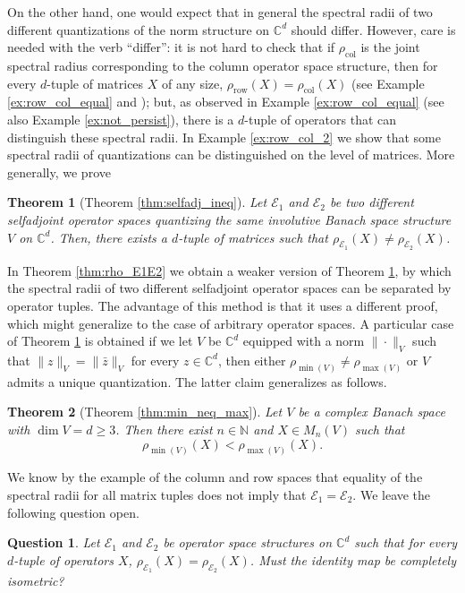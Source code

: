 \documentclass[12pt]{amsart}
\numberwithin{equation}{section}
\newtheorem{quest}[theorem]{Question}
\newtheorem{thmA}{Theorem}
\theoremstyle{definition}
\newcommand{\cE}{\mathcal{E}}
\newcommand{\C}{\mathbb{C}}
\begin{document}
On the other hand, one would expect that in general the spectral radii of two different quantizations of the norm structure on $\C^d$ should differ. However, care is needed with the verb ``differ'': it is not hard to check that if $\rho_{\operatorname{col}}$ is the joint spectral radius corresponding to the column operator space structure, then for every $d$-tuple of matrices $X$ of any size, $\rho_{\operatorname{row}}(X) = \rho_{\operatorname{col}}(X)$ (see Example \ref{ex:row_col_equal} and \cite[Lemma 2.1]{JMS-clark}); but, as observed in Example \ref{ex:row_col_equal} (see also Example \ref{ex:not_persist}), there is a $d$-tuple of operators that can distinguish these spectral radii. In Example \ref{ex:row_col_2} we show that some spectral radii of quantizations can be distinguished on the  level of matrices. More generally, we prove

\begin{thmA}[Theorem \ref{thm:selfadj_ineq}]\label{thm:B}
    Let $\cE_1$ and $\cE_2$ be two different selfadjoint operator spaces quantizing the same involutive Banach space structure $V$ on $\C^d$. Then, there exists a $d$-tuple of matrices such that $\rho_{\cE_1}(X) \neq \rho_{\cE_2}(X)$.
\end{thmA}
In Theorem \ref{thm:rho_E1E2} we obtain a weaker version of Theorem \ref{thm:B}, by which the spectral radii of two different selfadjoint operator spaces can be separated by operator tuples. 
The advantage of this method is that it uses a different proof, which might generalize to the case of arbitrary operator spaces. A particular case of Theorem \ref{thm:B} is obtained if we let $V$ be $\C^d$ equipped with a norm $\|\cdot\|_V$ such that $\|z\|_V = \|\bar{z}\|_V$ for every $z \in \C^d$, then either $\rho_{\min(V)} \neq \rho_{\max(V)}$ or $V$ admits a unique quantization. The latter claim generalizes as follows.
\begin{thmA}[Theorem \ref{thm:min_neq_max}]
    Let $V$ be a complex Banach space with $\dim V=d\geq 3$. Then there exist
$n\in\mathbb N$ and $X\in M_n(V)$ such that
  \[
    \rho_{\min(V)}(X)<\rho_{\max(V)}(X).
  \]
\end{thmA}

We know by the example of the column and row spaces that equality of the spectral radii for all matrix tuples does not imply that $\cE_1 = \cE_2$. We leave the following question open. 
\begin{quest}\label{quest:rho_E_1_2}
    Let $\cE_1$ and $\cE_2$ be operator space structures on $\C^d$ such that for every $d$-tuple of operators $X$, $\rho_{\cE_1}(X) = \rho_{\cE_2}(X)$. Must the identity map be completely isometric?
\end{quest}
\end{document}
